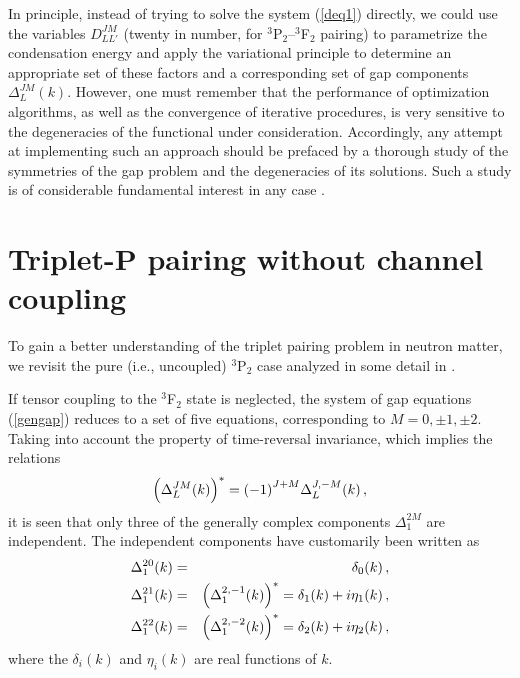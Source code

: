 In principle, instead of trying to solve the system (\ref {deq1})
directly, we could use the variables $D_{LL'}^{JM}$ (twenty in number,
for $^3$P$_2$--$^3$F$_2$ pairing) to parametrize the condensation
energy and apply the variational principle to determine an appropriate
set of these factors and a corresponding set of gap components
$\Delta_L^{JM}(k)$.  However, one must remember that the performance of
optimization algorithms, as well as the convergence of iterative
procedures, is very sensitive to the degeneracies of the functional under
consideration.  Accordingly, any attempt at implementing such an
approach should be prefaced by a thorough study of the symmetries of
the gap problem and the degeneracies of its solutions.  Such a study is
of considerable fundamental interest in any case \cite{univ}.

\section{Triplet-P pairing without channel coupling\label{sec:nocoupling}}

To gain a better understanding of the triplet pairing problem in
neutron matter, we revisit the pure (i.e., uncoupled) $^3$P$_2$ 
case analyzed in some detail in \cite{tt71,ttr,ostgaard}.

If tensor coupling to the $^3$F$_2$ state is neglected, the system
of gap equations (\ref{gengap}) reduces to a set of five equations,
corresponding to $M = 0, \pm 1, \pm 2$. Taking into account
the property of time-reversal invariance, which implies the relations
\begin{equation}
\Bigl(\Delta^{JM}_L(k)\Bigr)^* = {(-1)}^{J+M} \Delta^{J,-M}_L(k) \, ,
\end{equation}
it is seen that only three of the generally complex components
$\Delta_1^{2M}$ are independent.  The independent components have
customarily been written as \cite{tt71,ttr,ostgaard}
\begin{eqnarray}
\Delta^{20}_1(k) &=& \delta_0(k) \, , \nonumber \\
\Delta^{21}_1(k) &=& \Bigl( \Delta^{2,-1}_1(k) \Bigr)^*
	= \delta_1(k) + i \eta_1(k) \, , \nonumber \\
\Delta^{22}_1(k) &=& \Bigl( \Delta^{2,-2}_1(k) \Bigr)^*
	= \delta_2(k) + i \eta_2(k) \, ,
\label{deltaeta}
\end{eqnarray}
where the $\delta_i(k)$ and $\eta_i(k)$ are real functions of $k$.

